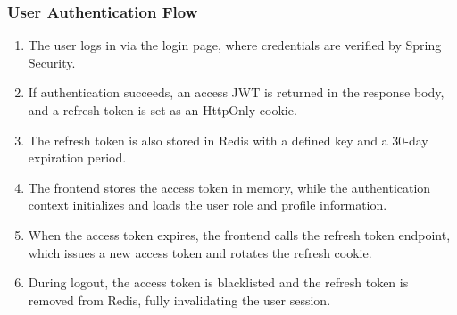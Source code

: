 \subsubsection{User Authentication Flow}
\begin{enumerate}
	\item The user logs in via the login page, where credentials are verified by Spring Security.
	
	\item If authentication succeeds, an access JWT is returned in the response body, and a refresh token is set as an HttpOnly cookie.
	
	\item The refresh token is also stored in Redis with a defined key and a 30-day expiration period.
	
	\item The frontend stores the access token in memory, while the authentication context initializes and loads the user role and profile information.
	
	\item When the access token expires, the frontend calls the refresh token endpoint, which issues a new access token and rotates the refresh cookie.
	
	\item During logout, the access token is blacklisted and the refresh token is removed from Redis, fully invalidating the user session.
\end{enumerate}

